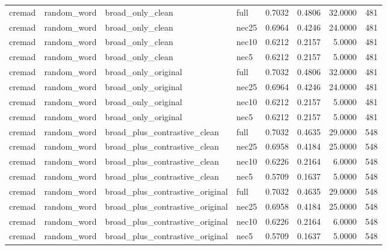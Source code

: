 \begin{table}[t]
\begin{tabular}{llllrrrr}
cremad & random\_word & broad\_only\_clean & full & 0.7032 & 0.4806 & 32.0000 & 481 \\
cremad & random\_word & broad\_only\_clean & nec25 & 0.6964 & 0.4246 & 24.0000 & 481 \\
cremad & random\_word & broad\_only\_clean & nec10 & 0.6212 & 0.2157 & 5.0000 & 481 \\
cremad & random\_word & broad\_only\_clean & nec5 & 0.6212 & 0.2157 & 5.0000 & 481 \\
cremad & random\_word & broad\_only\_original & full & 0.7032 & 0.4806 & 32.0000 & 481 \\
cremad & random\_word & broad\_only\_original & nec25 & 0.6964 & 0.4246 & 24.0000 & 481 \\
cremad & random\_word & broad\_only\_original & nec10 & 0.6212 & 0.2157 & 5.0000 & 481 \\
cremad & random\_word & broad\_only\_original & nec5 & 0.6212 & 0.2157 & 5.0000 & 481 \\
cremad & random\_word & broad\_plus\_contrastive\_clean & full & 0.7032 & 0.4635 & 29.0000 & 548 \\
cremad & random\_word & broad\_plus\_contrastive\_clean & nec25 & 0.6958 & 0.4184 & 25.0000 & 548 \\
cremad & random\_word & broad\_plus\_contrastive\_clean & nec10 & 0.6226 & 0.2164 & 6.0000 & 548 \\
cremad & random\_word & broad\_plus\_contrastive\_clean & nec5 & 0.5709 & 0.1637 & 5.0000 & 548 \\
cremad & random\_word & broad\_plus\_contrastive\_original & full & 0.7032 & 0.4635 & 29.0000 & 548 \\
cremad & random\_word & broad\_plus\_contrastive\_original & nec25 & 0.6958 & 0.4184 & 25.0000 & 548 \\
cremad & random\_word & broad\_plus\_contrastive\_original & nec10 & 0.6226 & 0.2164 & 6.0000 & 548 \\
cremad & random\_word & broad\_plus\_contrastive\_original & nec5 & 0.5709 & 0.1637 & 5.0000 & 548 \\
\bottomrule
\end{tabular}
\end{table}
